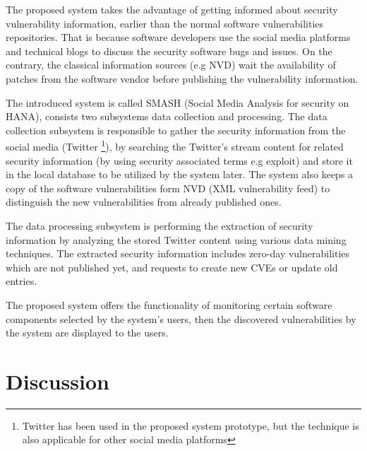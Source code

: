 \documentclass{llncs}
\begin{document}
\par
The proposed system takes the advantage of getting informed about security vulnerability information, earlier than the normal software vulnerabilities repositories. That is because software developers use the social media platforms and technical blogs to discuss the security software bugs and issues. On the contrary, the classical information sources (e.g NVD) wait the availability of patches from the software vendor before publishing the vulnerability information.

\par The introduced system is called SMASH (Social Media Analysis for security on HANA), consists two subsystems data collection and processing. The data collection subsystem is responsible to gather the security information from the social media (Twitter \footnote{Twitter has been used in the proposed system prototype, but the technique is also applicable for other social media platforms}), by searching the Twitter's stream content for related security information (by using security associated terms e.g exploit) and store it in the local database to be utilized by the system later. The system also keeps a copy of the software vulnerabilities form NVD (XML vulnerability feed) to distinguish the new  vulnerabilities from already published ones.
\par
The data processing subsystem is performing the extraction of security information by analyzing the stored Twitter content using various data mining techniques. The extracted security information 
includes zero-day vulnerabilities which are not published yet, and requests to create new CVEs or update old entries.

The proposed system offers the functionality of monitoring certain software components selected by the system's users, then the discovered vulnerabilities by the system are displayed to the users.
  

\section{Discussion}
\end{document}
